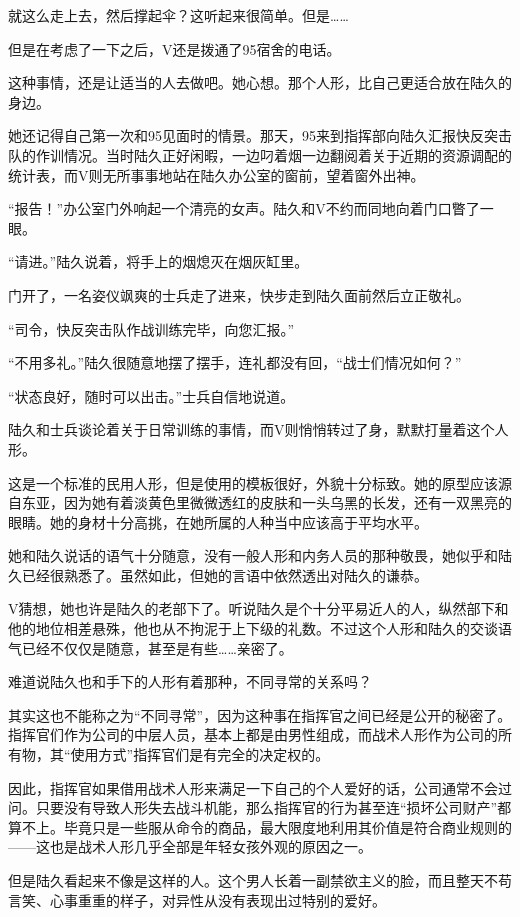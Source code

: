 就这么走上去，然后撑起伞？这听起来很简单。但是……

但是在考虑了一下之后，V还是拨通了95宿舍的电话。

这种事情，还是让适当的人去做吧。她心想。那个人形，比自己更适合放在陆久的身边。

她还记得自己第一次和95见面时的情景。那天，95来到指挥部向陆久汇报快反突击队的作训情况。当时陆久正好闲暇，一边叼着烟一边翻阅着关于近期的资源调配的统计表，而V则无所事事地站在陆久办公室的窗前，望着窗外出神。

“报告！”办公室门外响起一个清亮的女声。陆久和V不约而同地向着门口瞥了一眼。

“请进。”陆久说着，将手上的烟熄灭在烟灰缸里。

门开了，一名姿仪飒爽的士兵走了进来，快步走到陆久面前然后立正敬礼。

“司令，快反突击队作战训练完毕，向您汇报。”

“不用多礼。”陆久很随意地摆了摆手，连礼都没有回，“战士们情况如何？”

“状态良好，随时可以出击。”士兵自信地说道。

陆久和士兵谈论着关于日常训练的事情，而V则悄悄转过了身，默默打量着这个人形。

这是一个标准的民用人形，但是使用的模板很好，外貌十分标致。她的原型应该源自东亚，因为她有着淡黄色里微微透红的皮肤和一头乌黑的长发，还有一双黑亮的眼睛。她的身材十分高挑，在她所属的人种当中应该高于平均水平。

她和陆久说话的语气十分随意，没有一般人形和内务人员的那种敬畏，她似乎和陆久已经很熟悉了。虽然如此，但她的言语中依然透出对陆久的谦恭。

V猜想，她也许是陆久的老部下了。听说陆久是个十分平易近人的人，纵然部下和他的地位相差悬殊，他也从不拘泥于上下级的礼数。不过这个人形和陆久的交谈语气已经不仅仅是随意，甚至是有些……亲密了。

难道说陆久也和手下的人形有着那种，不同寻常的关系吗？

其实这也不能称之为“不同寻常”，因为这种事在指挥官之间已经是公开的秘密了。指挥官们作为公司的中层人员，基本上都是由男性组成，而战术人形作为公司的所有物，其“使用方式”指挥官们是有完全的决定权的。

因此，指挥官如果借用战术人形来满足一下自己的个人爱好的话，公司通常不会过问。只要没有导致人形失去战斗机能，那么指挥官的行为甚至连“损坏公司财产”都算不上。毕竟只是一些服从命令的商品，最大限度地利用其价值是符合商业规则的——这也是战术人形几乎全部是年轻女孩外观的原因之一。

但是陆久看起来不像是这样的人。这个男人长着一副禁欲主义的脸，而且整天不苟言笑、心事重重的样子，对异性从没有表现出过特别的爱好。

